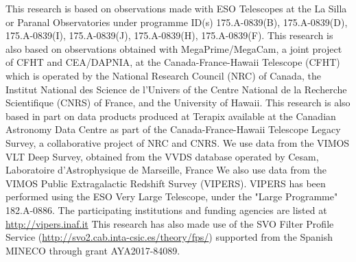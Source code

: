\documentclass[twocolumn]{aastex63}
\begin{document}
This research is based on observations made with ESO Telescopes at the La Silla or Paranal Observatories under programme ID(s) 175.A-0839(B), 175.A-0839(D), 175.A-0839(I), 175.A-0839(J), 175.A-0839(H), 175.A-0839(F).
This research is also based on observations obtained with MegaPrime/MegaCam, a joint project of CFHT and CEA/DAPNIA, at the Canada-France-Hawaii Telescope (CFHT) which is operated by the National Research Council (NRC) of Canada, the Institut National des Science de l'Univers of the Centre National de la Recherche Scientifique (CNRS) of France, and the University of Hawaii.
This research is also based in part on data products produced at Terapix available at the Canadian Astronomy Data Centre as part of the Canada-France-Hawaii Telescope Legacy Survey, a collaborative project of NRC and CNRS.
We use data from the VIMOS VLT Deep Survey, obtained from the VVDS database operated by Cesam, Laboratoire d'Astrophysique de Marseille, France
We also use data from the VIMOS Public Extragalactic Redshift Survey (VIPERS).
VIPERS has been performed using the ESO Very Large Telescope, under the "Large Programme" 182.A-0886. 
The participating institutions and funding agencies are listed at \url{http://vipers.inaf.it}
This research has also made use of the SVO Filter Profile Service (\url{http://svo2.cab.inta-csic.es/theory/fps/}) supported from the Spanish MINECO through grant AYA2017-84089.

    


{}

\end{document}
